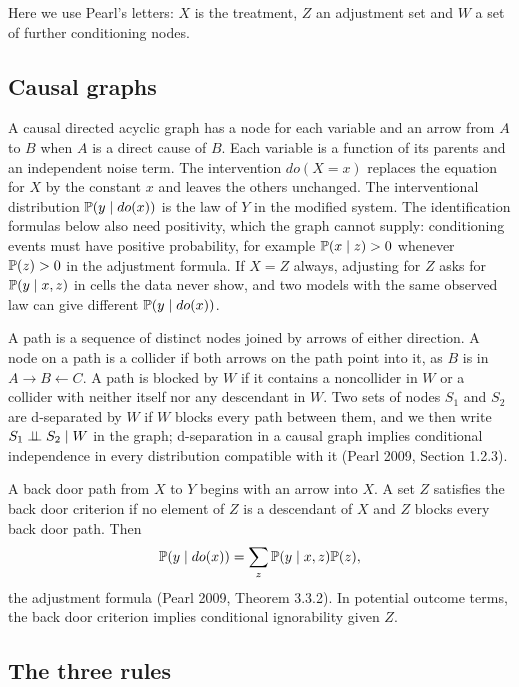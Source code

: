 Here we use Pearl's letters: $X$ is the treatment, $Z$ an adjustment set and $W$ a set of further conditioning nodes.

\subsection{Causal graphs}

A causal directed acyclic graph has a node for each variable and an arrow from $A$ to $B$ when $A$ is a direct cause of $B$. Each variable is a function of its parents and an independent noise term. The intervention $do(X = x)$ replaces the equation for $X$ by the constant $x$ and leaves the others unchanged. The interventional distribution $\mathbb{P}(y \mid do(x))$ is the law of $Y$ in the modified system. The identification formulas below also need positivity, which the graph cannot supply: conditioning events must have positive probability, for example $\mathbb{P}(x \mid z) > 0$ whenever $\mathbb{P}(z) > 0$ in the adjustment formula. If $X = Z$ always, adjusting for $Z$ asks for $\mathbb{P}(y \mid x, z)$ in cells the data never show, and two models with the same observed law can give different $\mathbb{P}(y \mid do(x))$.

A path is a sequence of distinct nodes joined by arrows of either direction. A node on a path is a collider if both arrows on the path point into it, as $B$ is in $A \to B \leftarrow C$. A path is blocked by $W$ if it contains a noncollider in $W$ or a collider with neither itself nor any descendant in $W$. Two sets of nodes $S_1$ and $S_2$ are d-separated by $W$ if $W$ blocks every path between them, and we then write $S_1 \perp\!\!\!\perp S_2 \mid W$ in the graph; d-separation in a causal graph implies conditional independence in every distribution compatible with it (Pearl 2009, Section 1.2.3).

A back door path from $X$ to $Y$ begins with an arrow into $X$. A set $Z$ satisfies the back door criterion if no element of $Z$ is a descendant of $X$ and $Z$ blocks every back door path. Then
\[
\mathbb{P}(y \mid do(x)) = \sum_z \mathbb{P}(y \mid x, z)\mathbb{P}(z),
\]
the adjustment formula (Pearl 2009, Theorem 3.3.2). In potential outcome terms, the back door criterion implies conditional ignorability given $Z$.

\subsection{The three rules}

